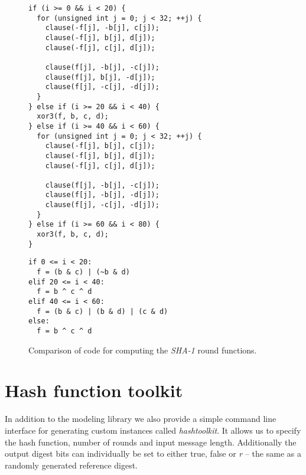 \newsavebox{\mintedboxleft}
\newsavebox{\mintedboxright}
\begin{sidewaysfigure}
\begin{lrbox}{\mintedboxleft}
\begin{minipage}[c]{.4\textwidth}
\vspace{.5cm}%
\begin{verbatim}
if (i >= 0 && i < 20) {
  for (unsigned int j = 0; j < 32; ++j) {
    clause(-f[j], -b[j], c[j]);
    clause(-f[j], b[j], d[j]);
    clause(-f[j], c[j], d[j]);

    clause(f[j], -b[j], -c[j]);
    clause(f[j], b[j], -d[j]);
    clause(f[j], -c[j], -d[j]);
  }
} else if (i >= 20 && i < 40) {
  xor3(f, b, c, d);
} else if (i >= 40 && i < 60) {
  for (unsigned int j = 0; j < 32; ++j) {
    clause(-f[j], b[j], c[j]);
    clause(-f[j], b[j], d[j]);
    clause(-f[j], c[j], d[j]);

    clause(f[j], -b[j], -c[j]);
    clause(f[j], -b[j], -d[j]);
    clause(f[j], -c[j], -d[j]);
  }
} else if (i >= 60 && i < 80) {
  xor3(f, b, c, d);
}
\end{verbatim}
\end{minipage}
\end{lrbox}
\begin{lrbox}{\mintedboxright}
\begin{minipage}[c]{.35\textwidth}
\vspace{.5cm}%
\begin{verbatim}
if 0 <= i < 20:
  f = (b & c) | (~b & d)
elif 20 <= i < 40:
  f = b ^ c ^ d
elif 40 <= i < 60:
  f = (b & c) | (b & d) | (c & d)
else:
  f = b ^ c ^ d
\end{verbatim}
\end{minipage}
\end{lrbox}
\centering
{}
\hspace{2cm}
\caption{Comparison of code for computing the \emph{SHA-1} round functions.}
\label{fig:code-comp-sha1}
\end{sidewaysfigure}

\section{Hash function toolkit}
In addition to the modeling library we also provide a simple command line interface for generating custom instances called \emph{hashtoolkit}.
It allows us to specify the hash function, number of rounds and input message length.
Additionally the output digest bits can individually be set to either true, false or \emph{r} -- the same as a randomly generated reference digest.

